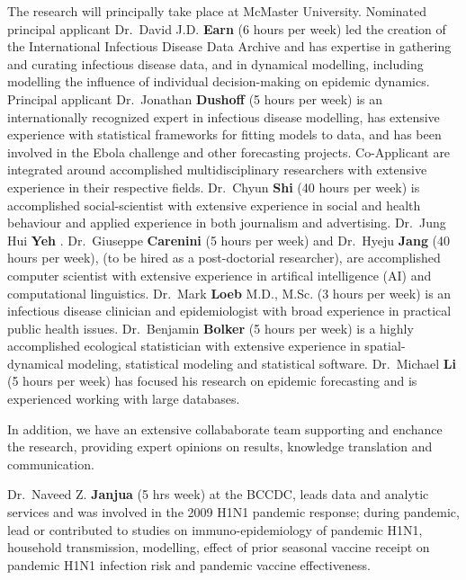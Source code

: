 
The research will principally take place at McMaster University. 
Nominated principal applicant Dr.\ David J.D. \textbf{Earn} (6 hours per week) led the creation of the International Infectious Disease Data Archive and has expertise in gathering and curating infectious disease data, and in dynamical modelling, including modelling the influence of individual decision-making on epidemic dynamics.
Principal applicant Dr.\ Jonathan \textbf{Dushoff} (5 hours per week) is an internationally recognized expert in infectious disease modelling, has extensive experience with statistical frameworks for fitting models to data, and has been involved in the Ebola challenge and other forecasting projects.
Co-Applicant are integrated around accomplished multidisciplinary researchers with extensive experience in their respective fields.
Dr.\ Chyun \textbf{Shi} (40 hours per week) is accomplished social-scientist with extensive experience in social and health behaviour and applied experience in both journalism and advertising. 
Dr.\ Jung Hui \textbf{Yeh} .
Dr.\ Giuseppe \textbf{Carenini} (5 hours per week) and Dr.\ Hyeju \textbf{Jang} (40 hours per week), (to be hired as a post-doctorial researcher), are accomplished computer scientist with extensive experience in artifical intelligence (AI) and computational linguistics.
Dr.\ Mark \textbf{Loeb} M.D., M.Sc. (3 hours per week) is an infectious disease clinician and epidemiologist with broad experience in practical public health issues.
Dr.\ Benjamin \textbf{Bolker} (5 hours per week) is a highly accomplished ecological statistician with extensive experience in spatial-dynamical modeling, statistical modeling and statistical software.
Dr.\ Michael \textbf{Li} (5 hours per week) has focused his research on epidemic forecasting and is experienced working with large databases. 

In addition, we have an extensive collababorate team supporting and enchance the research, providing expert opinions on results, knowledge translation and communication.

Dr.\ Naveed Z. \textbf{Janjua} (5 hrs week) at the BCCDC, leads data and analytic services and was involved in the 2009 H1N1 pandemic response; during pandemic, lead or contributed to studies on  immuno-epidemiology of pandemic H1N1, household transmission, modelling, effect of prior seasonal vaccine receipt on pandemic H1N1 infection risk and pandemic vaccine effectiveness. 

